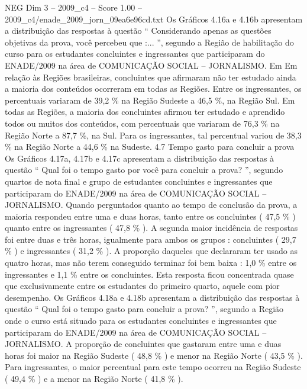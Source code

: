 \begin{textsample}{NEG Dim 3 – 2009\_c4 – Score 1.00 – 2009\_c4/enade\_2009\_jorn\_09ea6e96cd.txt}
Os Gráficos 4.16a e 4.16b apresentam a distribuição das respostas à questão “ Considerando apenas as questões objetivas da prova, você percebeu que :... ”, segundo a Região de habilitação do curso para os estudantes concluintes e ingressantes que participaram do ENADE/2009 na área de COMUNICAÇÃO SOCIAL – JORNALISMO.
Em Em relação às Regiões brasileiras, concluintes que afirmaram não ter estudado ainda a maioria dos conteúdos ocorreram em todas as Regiões.
Entre os ingressantes, os percentuais variaram de 39,2 \% na Região Sudeste a 46,5 \%, na Região Sul.
Em todas as Regiões, a maioria dos concluintes afirmou ter estudado e aprendido todos ou muitos dos conteúdos, com percentuais que variaram de 76,3 \% na Região Norte a 87,7 \%, na Sul.
Para os ingressantes, tal percentual variou de 38,3 \% na Região Norte a 44,6 \% na Sudeste. 4.7 Tempo gasto para concluir a prova Os Gráficos 4.17a, 4.17b e 4.17c apresentam a distribuição das respostas à questão “ Qual foi o tempo gasto por você para concluir a prova? ”, segundo quartos de nota final e grupo de estudantes concluintes e ingressantes que participaram do ENADE/2009 na área de COMUNICAÇÃO SOCIAL – JORNALISMO.
Quando perguntados quanto ao tempo de conclusão da prova, a maioria respondeu entre uma e duas horas, tanto entre os concluintes ( 47,5 \% ) quanto entre os ingressantes ( 47,8 \% ).
A segunda maior incidência de respostas foi entre duas e três horas, igualmente para ambos os grupos : concluintes ( 29,7 \% ) e ingressantes ( 31,2 \% ).
A proporção daqueles que declararam ter usado as quatro horas, mas não terem conseguido terminar foi bem baixa : 1,0 \% entre os ingressantes e 1,1 \% entre os concluintes.
Esta resposta ficou concentrada quase que exclusivamente entre os estudantes do primeiro quarto, aquele com pior desempenho.
Os Gráficos 4.18a e 4.18b apresentam a distribuição das respostas à questão “ Qual foi o tempo gasto para concluir a prova? ”, segundo a Região onde o curso está situado para os estudantes concluintes e ingressantes que participaram do ENADE/2009 na área de COMUNICAÇÃO SOCIAL – JORNALISMO.
A proporção de concluintes que gastaram entre uma e duas horas foi maior na Região Sudeste ( 48,8 \% ) e menor na Região Norte ( 43,5 \% ).
Para ingressantes, o maior percentual para este tempo ocorreu na Região Sudeste ( 49,4 \% ) e a menor na Região Norte ( 41,8 \% ).

\end{textsample}
